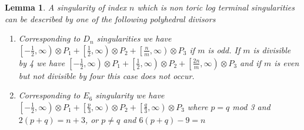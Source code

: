 \documentclass[12pt,a4paper]{book}      %
\newtheorem{lem}[thm]{Lemma}
\theoremstyle{definition}
\begin{document}
\begin{lem}\label{basic bound}
A singularity of index $n$ which is non toric log terminal singularities can be described by one of the following polyhedral divisors
\begin{enumerate}


\item Corresponding to $D_n$ singularities we have $\left[-\frac{1}{2}, \infty \right) \otimes P_1 + \left[ \frac{1}{2}, \infty \right) \otimes P_2 + \left[ \frac{n}{m}, \infty \right) \otimes P_3$ if $m$ is odd.  If $m$ is divisible by 4 we have $\left[-\frac{1}{2}, \infty \right) \otimes P_1 + \left[ \frac{1}{2}, \infty \right) \otimes P_2 + \left[ \frac{2n}{m}, \infty \right) \otimes P_3$ and if $m$ is even but not divisible by four this case does not occur.

\item Corresponding to $E_6$ singularity we have $\left[-\frac{1}{2}, \infty \right) \otimes P_1 + \left[ \frac{p}{3}, \infty \right) \otimes P_2 + \left[ \frac{q}{3}, \infty \right) \otimes P_3$ where $p=q$ mod 3 and $2(p+q) = n+3$, or $p \neq q$ and $6(p+q) - 9 = n$
\end{enumerate}
\end{lem}
\end{document}
